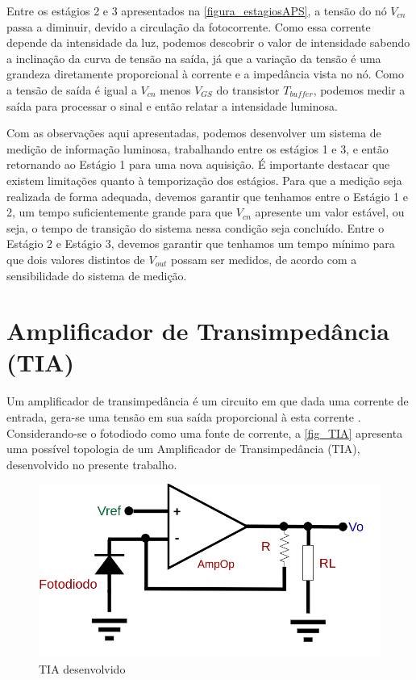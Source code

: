Entre os est\'agios 2 e 3 apresentados na \autoref{figura_estagiosAPS}, a tensão do n\'o $V_{cn}$ passa a diminuir, devido a circulação da fotocorrente. Como essa corrente depende da intensidade da luz, podemos descobrir o valor de intensidade sabendo a inclinação da curva de tensão na sa\'ida, j\'a que a variação da tensão \'e uma grandeza diretamente proporcional à corrente e a imped\^ancia vista no n\'o. Como a tensão de sa\'ida \'e igual a $V_{cn}$ menos $V_{GS}$ do transistor $T_{buffer}$, podemos medir a sa\'ida para processar o sinal e então relatar a intensidade luminosa.

Com as observações aqui apresentadas, podemos desenvolver um sistema de medição de informação luminosa, trabalhando entre os est\'agios 1 e 3, e então retornando ao Estágio 1 para uma nova aquisição. \'E importante destacar que existem limitações quanto \`a temporização dos est\'agios. Para que a medição seja realizada de forma adequada, devemos garantir que tenhamos entre o Est\'agio 1 e 2, um tempo suficientemente grande para que $V_{cn}$ apresente um valor estável, ou seja, o tempo de transição do sistema nessa condição seja conclu\'ido. Entre o Est\'agio 2 e Est\'agio 3, devemos garantir que tenhamos um tempo mínimo para que dois valores distintos de $V_{out}$ possam ser medidos, de acordo com a sensibilidade do sistema de medição.

\section{Amplificador de Transimped\^ancia (TIA)}
\label{section:TIA}

Um amplificador de transimped\^ancia \'e um circuito em que dada uma corrente de entrada, gera-se uma tensão em sua sa\'ida proporcional \`a esta corrente \cite{RazaviFundM}. Considerando-se o fotodiodo como uma fonte de corrente, a \autoref{fig_TIA} apresenta uma poss\'ivel topologia de um Amplificador de Transimped\^ancia (TIA), desenvolvido no presente trabalho.

\begin{figure}[!h]
	\caption{\label{fig_TIA}TIA desenvolvido}
	\begin{center}
	    \includegraphics[scale=0.3]{Circuitos/TIA.png}
	\end{center}
\end{figure}

